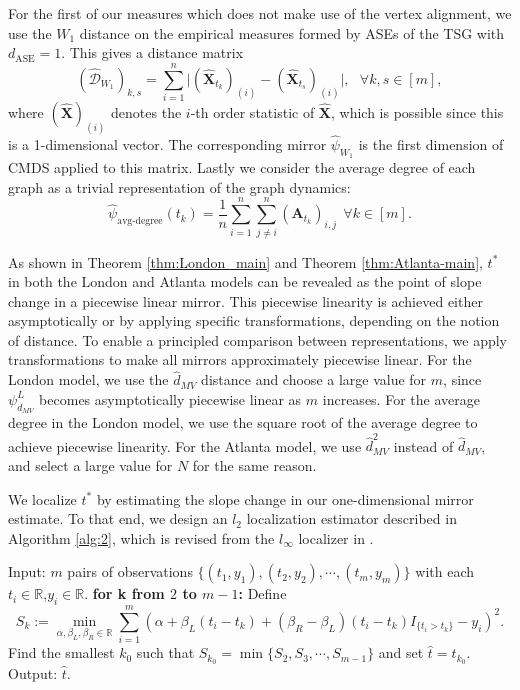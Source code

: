 \documentclass[12pt]{article}
\theoremstyle{definition}
\newcommand{\R}{\mathbb{R}}
\newcommand{\bA}{\mathbf{A}}
\newcommand{\bX}{\mathbf{X}}
\begin{document}
For the first of our measures which does not make use of the vertex alignment, we use the $W_1$ distance on the empirical measures formed by ASEs of the TSG with $d_{\text{ASE}}=1$. This gives a distance matrix 
$$
\left(\hat{\mathcal{D}}_{W_1}\right)_{k,s} 
 {=}  \sum^n_{i=1}  \biggl|(\hat{\bX}_{t_k})_{(i)} - (\hat{\bX}_{t_s} )_{(i)}\biggr|, ~~~ \forall k,s\in[m],
$$
where $(\hat{\bX})_{(i)}$ denotes the $i$-th order statistic of $\hat{\bX}$, which is possible since this is a 1-dimensional vector. The corresponding mirror $\hat{\psi}_{W_1}$ is the first dimension of CMDS applied to this matrix. Lastly we consider the average degree of each graph as a trivial representation of the graph dynamics:
$$
\hat{\psi}_{\text{avg-degree}}(t_k)= \frac{1}{n} \sum^n_{i =1} \sum^n_{j \neq i} \left(\bA_{t_k}\right)_{i,j} ~~ \forall k \in[m]. 
$$

As shown in Theorem \ref{thm:London_main} and Theorem \ref{thm:Atlanta-main}, $t^*$ in both the London and Atlanta models can be revealed as the point of slope change in a piecewise linear mirror. 
This piecewise linearity is achieved either asymptotically or by applying specific transformations, depending on the notion of distance. 
To enable a principled comparison between representations, we apply transformations to make all mirrors approximately piecewise linear.
For the London model, we use the $\hat{d}_{MV}$ distance and choose a large value for $m$, since $\psi^L_{d_{MV}}$ becomes asymptotically piecewise linear as $m$ increases.
For the average degree in the London model, we use the square root of the average degree to achieve piecewise linearity.
For the Atlanta model, we use $\hat{d}^2_{MV}$ instead of $\hat{d}_{MV}$, and select a large value for $N$ for the same reason.

We localize $t^*$ by estimating the slope change in our one-dimensional mirror estimate.
To that end, we design an $l_2$ localization estimator described in Algorithm \ref{alg:2}, which is revised from the $l_{\infty}$ localizer in \cite{chen2024euclidean}.
\begin{algorithm}
\caption{$l_2$ localization for piecewise linear data}
\label{alg:2}
\begin{algorithmic}[1]
\State Input: $m$ pairs of observations $\{(t_1,y_1),(t_2,y_2),\cdots,(t_m,y_m)\}$ with each $t_i\in \R$,$y_i\in \R$.
\State \textbf{for k from $2$ to $m-1$:}
\State \quad Define $$S_k:=\min_{\alpha, \beta_L, \beta_R \in \R} 
\sum^m_{ i = 1 } \left( \alpha + \beta_L(t_i-t_k)+(\beta_R-\beta_L)(t_i-t_k)I_{\{t_i > t_k\}} - y_i \right)^2.$$
\State Find the smallest $k_0$ such that $S_{k_0}= \min\{S_2,S_3,\cdots,S_{m-1}\}$ and set $\hat{t}=t_{k_0}$.
\State Output: $\hat{t}$. 
\end{algorithmic}
\end{algorithm}
\end{document}
